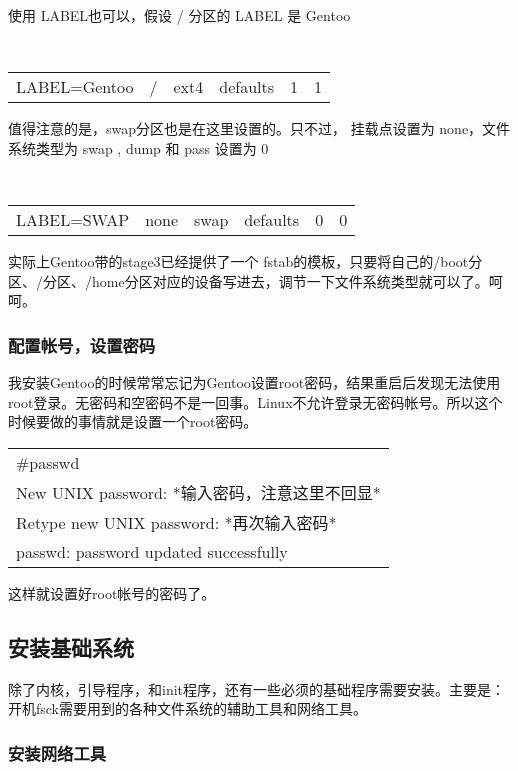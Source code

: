 \documentclass[amstex,twoside]{ctexbook}
\newenvironment{code}{\small\tt\begin{longtable}{p{0.8\textwidth}}}{\end{longtable}}
\begin{document}
使用 LABEL也可以，假设 / 分区的 LABEL 是 Gentoo

\begin{small}
\tt 
\begin{longtable}{cccccc}
LABEL=Gentoo	& /	 & ext4	& defaults & 1 & 1
\end{longtable}
\end{small}

值得注意的是，swap分区也是在这里设置的。只不过， 挂载点设置为 none，文件系统类型为 swap , dump 和 pass 设置为 0 

\begin{small}
\tt 
\begin{longtable}{cccccc}
LABEL=SWAP	& none	 & swap	& defaults & 0 & 0
\end{longtable}
\end{small}

实际上Gentoo带的stage3已经提供了一个 fstab的模板，只要将自己的/boot分区、/分区、/home分区对应的设备写进去，调节一下文件系统类型就可以了。呵呵。


\subsubsection{配置帐号，设置密码}

我安装Gentoo的时候常常忘记为Gentoo设置root密码，结果重启后发现无法使用root登录。无密码和空密码不是一回事。Linux不允许登录无密码帐号。所以这个时候要做的事情就是设置一个root密码。

\begin{code}
\#passwd\\
New UNIX password: *输入密码，注意这里不回显*\\
Retype new UNIX password: *再次输入密码*\\
passwd: password updated successfully
\end{code}

这样就设置好root帐号的密码了。

\subsection{安装基础系统}

除了内核，引导程序，和init程序，还有一些必须的基础程序需要安装。主要是：开机fsck需要用到的各种文件系统的辅助工具和网络工具。

\subsubsection{安装网络工具}
\end{document}

